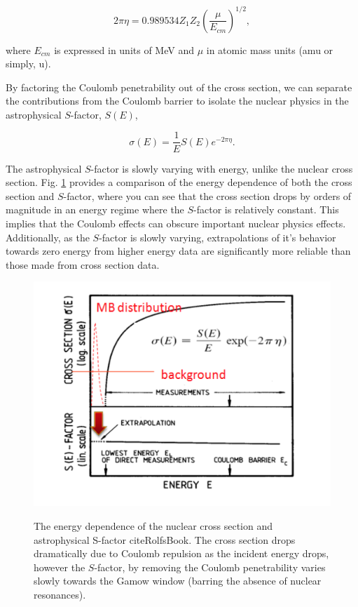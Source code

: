 \begin{equation}
2\pi \eta = 0.989534 Z_{1} Z_{2} \left( \dfrac{\mu}{E_{cm}} \right)^{1/2}, 
\label{eqn: gamow factor}
\end{equation}

\noindent where $E_{cm}$ is expressed in units of MeV and $\mu$ in atomic mass units (amu or simply, u). 

By factoring the Coulomb penetrability out of the cross section, we can separate the contributions from the Coulomb barrier to isolate the nuclear physics in the astrophysical $S$-factor, $S(E)$, 

\begin{equation}
\sigma(E) = \dfrac{1}{E} S(E) e^{-2\pi \eta}.
\label{eqn: s-factor definition}
\end{equation}

\noindent The astrophysical $S$-factor is slowly varying with energy, unlike the nuclear cross section. Fig. \ref{fig: energy dependence} provides a comparison of the energy dependence of both the cross section and $S$-factor, where you can see that the cross section drops by orders of magnitude in an energy regime where the $S$-factor is relatively constant. This implies that the Coulomb effects can obscure important nuclear physics effects. Additionally, as the $S$-factor is slowly varying, extrapolations of it's behavior towards zero energy from higher energy data are significantly more reliable than those made from cross section data. 

\begin{figure}
\includegraphics[width=\linewidth]{figures/crossSectionDependence.png}
\label{fig: energy dependence}
\caption{The energy dependence of the nuclear cross section and astrophysical S-factor cite{RolfsBook}. The cross section drops dramatically due to Coulomb repulsion as the incident energy drops, however the $S$-factor, by removing the Coulomb penetrability varies slowly towards the Gamow window (barring the absence of nuclear resonances). }
\end{figure}

